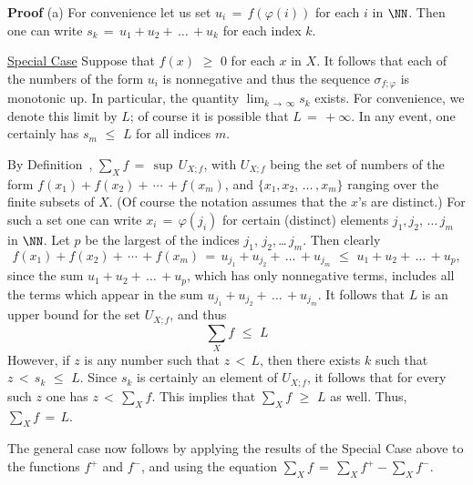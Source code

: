         {\bf Proof} (a) For convenience let us set $u_{i} \,=\, f({\varphi}(i))$ for each $i$ in ${\NN}$.
    Then one can write $s_{k} \,=\, u_{1}+u_{2}+\,{\ldots}\,+u_{k}$ for each index $k$.

        \underline{Special Case} Suppose that $f(x)\,\,{\geq}\,\,0$ for each $x$ in $X$.
    It follows that each of the numbers of the form $u_{i}$ is nonnegative and thus the sequence ${\sigma}_{f;{\varphi}}$ is monotonic up.
    In particular, the quantity $\lim_{k \,{\rightarrow}\, {\infty}} s_{k}$ exists. For convenience, we denote this limit by $L$; of course it is possible that $L \,=\, +{\infty}$.
    In any event, one certainly has $s_{m}\,\,{\leq}\,\,L$ for all indices $m$.

    By Definition~, ${\sum}_{X} f \,=\, {\sup}\,U_{X;f}$, with $U_{X;f}$ being the set of numbers of the form $f(x_{1})+f(x_{2})+ \,{\cdots}\, +f(x_{m})$,     
    and  $\{x_{1},x_{2},\,{\ldots}\,,x_{m}\}$ ranging over the finite subsets of $X$.
    (Of course the notation assumes that the $x$'s are distinct.)
    For such a set one can write $x_{i} \,=\, {\varphi}(j_{i})$ for certain (distinct) elements $j_{1},j_{2},\,{\ldots}\,j_{m}$ in ${\NN}$.
    Let $p$ be the largest of the indices $j_{1}$, $j_{2}$,\,{\ldots}\,$j_{m}$. Then clearly
        \begin{displaymath}
        f(x_{1})+f(x_{2})+ \,{\cdots}\, +f(x_{m}) \,=\, u_{j_{1}}+u_{j_{2}}+\,{\ldots}\,+u_{j_{m}}\,\,{\leq}\,\,u_{1}+u_{2}+\,{\ldots}\,+u_{p},
        \end{displaymath}
    since the sum $u_{1}+u_{2}+\,{\ldots}\,+u_{p}$, which has only nonnegative terms, includes all the terms which appear in the sum $u_{j_{1}}+u_{j_{2}}+\,{\ldots}\,+u_{j_{m}}$.
    It follows that $L$ is an upper bound for the set $U_{X;f}$, and thus
        \begin{displaymath}
        {\sum}_{X} f\,\,{\leq}\,\,L
        \end{displaymath}
    However, if $z$ is any number such that $z\,<\,L$, then there exists $k$ such that $z\,<\,s_{k}\,\,{\leq}\,\,L$.
    Since $s_{k}$ is certainly an element of $U_{X;f}$, it follows that for every such $z$ one has $z\,<\,{\sum}_{X} f$.
    This implies that ${\sum}_{X} f\,\,{\geq}\,\,L$ as well. Thus, ${\sum}_{X} f \,=\, L$.

        The general case now follows by applying the results of the Special Case above to the functions $f^{+}$ and $f^{-}$, and using the equation $\sum_{X} f \,=\, \sum_{X} f^{+} - \sum_{X} f^{-}$.

